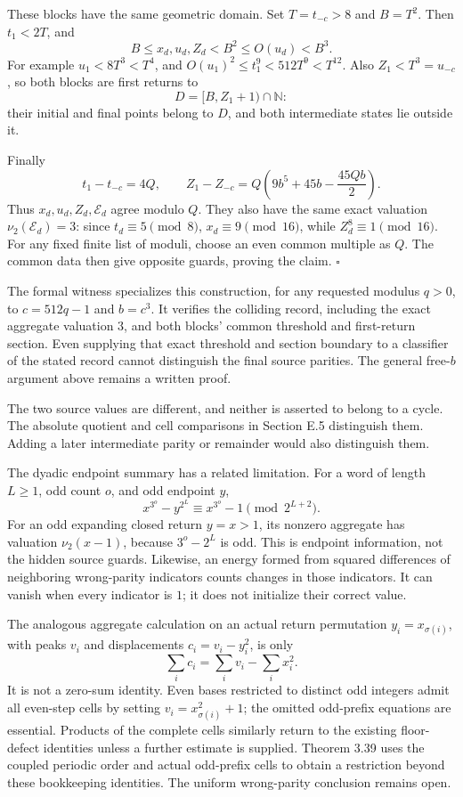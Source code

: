 \documentclass[12pt]{article}
\begin{document}
These blocks have the same geometric domain. Set \(T=t_{-c}>8\) and
\(B=T^2\). Then \(t_1<2T\), and \[
B\le x_d,u_d,Z_d<B^2\le O(u_d)<B^3.
\] For example \(u_1<8T^3<T^4\), and
\(O(u_1)^2\le t_1^9<512T^9<T^{12}\). Also \(Z_1<T^3=u_{-c}\), so both
blocks are first returns to \[
D=[B,Z_1+1)\cap\mathbb N:
\] their initial and final points belong to \(D\), and both intermediate
states lie outside it.

Finally \[
t_1-t_{-c}=4Q,\qquad
Z_1-Z_{-c}=Q\left(9b^5+45b-\frac{45Qb}{2}\right).
\] Thus \(x_d,u_d,Z_d,\mathcal E_d\) agree modulo \(Q\). They also have
the same exact valuation \(\nu_2(\mathcal E_d)=3\): since
\(t_d\equiv5\pmod8\), \(x_d\equiv9\pmod{16}\), while
\(Z_d^8\equiv1\pmod{16}\). For any fixed finite list of moduli, choose
an even common multiple as \(Q\). The common data then give opposite
guards, proving the claim. \(\square\)

The formal witness specializes this construction, for any requested
modulus \(q>0\), to \(c=512q-1\) and \(b=c^3\). It verifies the
colliding record, including the exact aggregate valuation \(3\), and
both blocks' common threshold and first-return section. Even supplying
that exact threshold and section boundary to a classifier of the stated
record cannot distinguish the final source parities. The general
free-\(b\) argument above remains a written proof.

The two source values are different, and neither is asserted to belong
to a cycle. The absolute quotient and cell comparisons in Section E.5
distinguish them. Adding a later intermediate parity or remainder would
also distinguish them.

The dyadic endpoint summary has a related limitation. For a word of
length \(L\ge1\), odd count \(o\), and odd endpoint \(y\), \[
x^{3^o}-y^{2^L}\equiv x^{3^o}-1\pmod{2^{L+2}}.
\] For an odd expanding closed return \(y=x>1\), its nonzero aggregate
has valuation \(\nu_2(x-1)\), because \(3^o-2^L\) is odd. This is
endpoint information, not the hidden source guards. Likewise, an energy
formed from squared differences of neighboring wrong-parity indicators
counts changes in those indicators. It can vanish when every indicator
is \(1\); it does not initialize their correct value.

The analogous aggregate calculation on an actual return permutation
\(y_i=x_{\sigma(i)}\), with peaks \(v_i\) and displacements
\(c_i=v_i-y_i^2\), is only \[
\sum_i c_i=\sum_i v_i-\sum_i x_i^2.
\] It is not a zero-sum identity. Even bases restricted to distinct odd
integers admit all even-step cells by setting \(v_i=x_{\sigma(i)}^2+1\);
the omitted odd-prefix equations are essential. Products of the complete
cells similarly return to the existing floor-defect identities unless a
further estimate is supplied. Theorem 3.39 uses the coupled periodic
order and actual odd-prefix cells to obtain a restriction beyond these
bookkeeping identities. The uniform wrong-parity conclusion remains
open.
\end{document}
